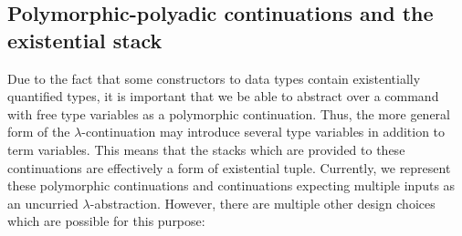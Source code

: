 \documentclass{article}
\begin{document}
\subsection{Polymorphic-polyadic continuations and the existential stack}

Due to the fact that some constructors to data types contain existentially
quantified types, it is important that we be able to abstract over a command
with free type variables as a polymorphic continuation.  Thus, the more general
form of the $\lambda$-continuation may introduce several type variables in
addition to term variables.  This means that the stacks which are provided to
these continuations are effectively a form of existential tuple.  Currently, we
represent these polymorphic continuations and continuations expecting multiple
inputs as an uncurried $\lambda$-abstraction.  However, there are multiple other
design choices which are possible for this purpose:
\end{document}
